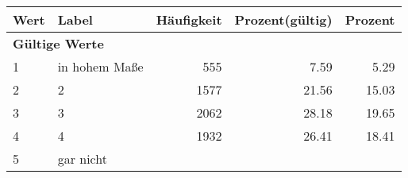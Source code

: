      \begin{longtable}{lXrrr}
     \toprule
     \textbf{Wert} & \textbf{Label} & \textbf{Häufigkeit} & \textbf{Prozent(gültig)} & \textbf{Prozent} \\
     \endhead
     \midrule
     \multicolumn{5}{l}{\textbf{Gültige Werte}}\\

     1 &
     \multicolumn{1}{X}{ in hohem Maße   } &


       \num{555} &
       \num[round-mode=places,round-precision=2]{7.59} &
         \num[round-mode=places,round-precision=2]{5.29} \\

     2 &
     \multicolumn{1}{X}{ 2   } &


       \num{1577} &
       \num[round-mode=places,round-precision=2]{21.56} &
         \num[round-mode=places,round-precision=2]{15.03} \\

     3 &
     \multicolumn{1}{X}{ 3   } &


       \num{2062} &
       \num[round-mode=places,round-precision=2]{28.18} &
         \num[round-mode=places,round-precision=2]{19.65} \\

     4 &
     \multicolumn{1}{X}{ 4   } &


       \num{1932} &
       \num[round-mode=places,round-precision=2]{26.41} &
         \num[round-mode=places,round-precision=2]{18.41} \\

     5 &
     \multicolumn{1}{X}{ gar nicht   } &



\end{longtable}

